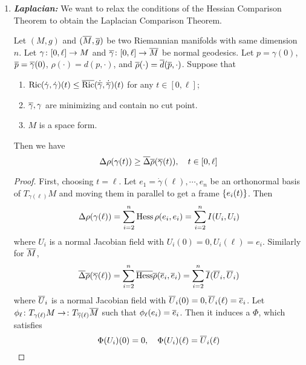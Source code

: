 \begin{enumerate}[label=\arabic{*}]
	\item \emph{\textbf{Laplacian:}} We want to relax the conditions of the Hessian Comparison Theorem to obtain the Laplacian Comparison Theorem.
	\begin{thm}
		Let $(M,g)$ and $(\overline{M},\overline{g})$ be two Riemannian manifolds with same dimension $n$. Let $\gamma \colon [0,\ell] \rightarrow M$ and $\overline{\gamma} \colon [0,\ell] \rightarrow \overline{M}$ be normal geodesics. Let $p = \gamma(0)$, $\overline{p} = \overline{\gamma}(0)$, $\rho(\cdot) = d(p,\cdot)$, and $\overline{\rho}(\cdot)=\overline{d}(\overline{p},\cdot)$. Suppose that
		\begin{enumerate}[label=(\arabic{*})]
			\item $\operatorname{Ric}(\dot{\gamma},\dot{\gamma})(t) \leq \overline{\operatorname{Ric}}(\dot{{\overline{\gamma}}},\dot{\overline{\gamma}})(t)$ for any $t \in [0,\ell]$;
			\item $\overline{\gamma},\gamma$ are minimizing and contain no cut point.
			\item $M$ is a space form.
		\end{enumerate}
		Then we have
		\begin{equation*}
			\Delta \rho(\gamma(t)) \geq \overline{\Delta} \overline{\rho}(\overline{\gamma}(t)),\quad t \in [0,\ell]
		\end{equation*}
	\end{thm}
	\begin{proof}
		First, choosing $t = \ell$. Let $e_1 = \dot{\gamma}(\ell),\cdots,e_n$ be an orthonormal basis of $T_{\gamma(\ell)}M$ and moving them in parallel to get a frame $\left\{e_i(t)\right\}$. Then
		\begin{equation*}
			\Delta \rho(\gamma(\ell)) = \sum_{i=2}^n \operatorname{Hess}\rho(e_i,e_i) = \sum_{i=2}^n I(U_i,U_i)
		\end{equation*}
		where $U_i$ is a normal Jacobian field with $U_i(0)=0,U_i(\ell) = e_i$. Similarly for $\overline{M}$,
		\begin{equation*}
			\overline{\Delta} \overline{\rho}(\overline{\gamma}(\ell)) = \sum_{i=2}^n \overline{\operatorname{Hess}}\overline{\rho}(\overline{e}_i,\overline{e}_i) = \sum_{i=2}^n \overline{I}(\overline{U}_i,\overline{U}_i)
		\end{equation*}
		where $\overline{U}_i$ is a normal Jacobian field with $\overline{U}_i(0)=0,\overline{U}_i(\ell) = \overline{e}_i$. 
		Let $\phi_\ell \colon T_{\gamma(\ell)}M \rightarrow \colon T_{\overline{\gamma}(\ell)}\overline{M}$ such that $\phi_\ell(e_i) = \overline{e}_i$. Then it induces a $\Phi$, which satisfies
		\begin{equation*}
			\Phi(U_i)(0) = 0,\quad \Phi(U_i)(\ell) = \overline{U}_i(\ell)
		\end{equation*}

\end{proof}
\end{enumerate}
